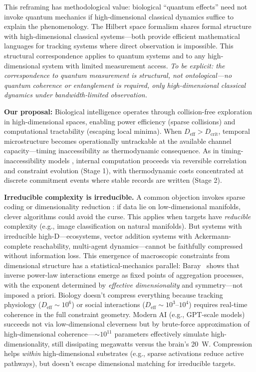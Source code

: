 \documentclass[12pt]{article}
\begin{document}
This reframing has methodological value: biological ``quantum effects'' need not invoke quantum mechanics if high-dimensional classical dynamics suffice to explain the phenomenology. The Hilbert space formalism shares formal structure with high-dimensional classical systems---both provide efficient mathematical languages for tracking systems where direct observation is impossible. This structural correspondence applies to quantum systems and to any high-dimensional system with limited measurement access. \textit{To be explicit: the correspondence to quantum measurement is structural, not ontological---no quantum coherence or entanglement is required, only high-dimensional classical dynamics under bandwidth-limited observation.}

\textbf{Our proposal:} Biological intelligence operates through collision-free exploration in high-dimensional spaces, enabling power efficiency (sparse collisions) and computational tractability (escaping local minima). When $D_{\text{eff}} > D_{\text{crit}}$, temporal microstructure becomes operationally untrackable at the available channel capacity—timing inaccessibility as thermodynamic consequence. As in timing-inaccessibility models \cite{todd2025maxwell}, internal computation proceeds via reversible correlation and constraint evolution (Stage 1), with thermodynamic costs concentrated at discrete commitment events where stable records are written (Stage 2).

\textbf{Irreducible complexity is irreducible.} A common objection invokes sparse coding or dimensionality reduction \cite{bengio2013}: if data lie on low-dimensional manifolds, clever algorithms could avoid the curse. This applies when targets have \textit{reducible} complexity (e.g., image classification on natural manifolds). But systems with irreducible high-D—ecosystems, vector addition systems with Ackermann-complete reachability, multi-agent dynamics—cannot be faithfully compressed without information loss. This emergence of macroscopic constraints from dimensional structure has a statistical-mechanics parallel: Baray~\cite{baray2025zipf} shows that inverse power-law interactions emerge as fixed points of aggregation processes, with the exponent determined by \textit{effective dimensionality} and symmetry---not imposed a priori. Biology doesn't compress everything because tracking physiology ($D_{\text{eff}} \sim 10^6$) or social interactions ($D_{\text{eff}} \sim 10^3$--$10^4$) requires real-time coherence in the full constraint geometry. Modern AI (e.g., GPT-scale models) succeeds not via low-dimensional cleverness but by brute-force approximation of high-dimensional coherence—$\sim 10^{11}$ parameters effectively simulate high-dimensionality, still dissipating megawatts versus the brain's 20~W. Compression helps \textit{within} high-dimensional substrates (e.g., sparse activations reduce active pathways), but doesn't escape dimensional matching for irreducible targets.
\end{document}
